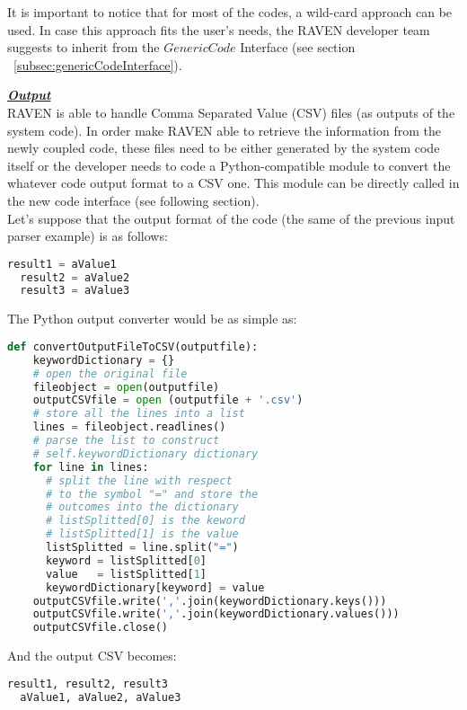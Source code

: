 It is important to notice that for most of the codes, a wild-card approach can be used. In case this approach fits the user's needs,
the RAVEN developer team suggests to inherit from the $GenericCode$ Interface (see section ~\ref{subsec:genericCodeInterface}).

\textbf{\textit{\underline{Output}}}
\newline
\\RAVEN is able to handle Comma Separated Value (CSV) files (as outputs
of the system code). In order make RAVEN able to retrieve the information
 from the newly coupled code, these files need to be  either generated by the
 system code itself or the developer needs to code a Python-compatible
module to convert the whatever code output format to a CSV one.
This module can be  directly called in the new code interface (see following section).
\\ Let's suppose that the output format of the code (the same of the previous
input parser example) is as follows:
\begin{lstlisting}[language=python]
  result1 = aValue1
  result2 = aValue2
  result3 = aValue3
\end{lstlisting}
The Python output converter would be as simple as:
\begin{lstlisting}[language=python]
def convertOutputFileToCSV(outputfile):
    keywordDictionary = {}
    # open the original file
    fileobject = open(outputfile)
    outputCSVfile = open (outputfile + '.csv')
    # store all the lines into a list
    lines = fileobject.readlines()
    # parse the list to construct
    # self.keywordDictionary dictionary
    for line in lines:
      # split the line with respect
      # to the symbol "=" and store the
      # outcomes into the dictionary
      # listSplitted[0] is the keword
      # listSplitted[1] is the value
      listSplitted = line.split("=")
      keyword = listSplitted[0]
      value   = listSplitted[1]
      keywordDictionary[keyword] = value
    outputCSVfile.write(','.join(keywordDictionary.keys()))
    outputCSVfile.write(','.join(keywordDictionary.values()))
    outputCSVfile.close()
\end{lstlisting}
And the output CSV becomes:
\begin{lstlisting}[language=python]
  result1, result2, result3
  aValue1, aValue2, aValue3
\end{lstlisting}
